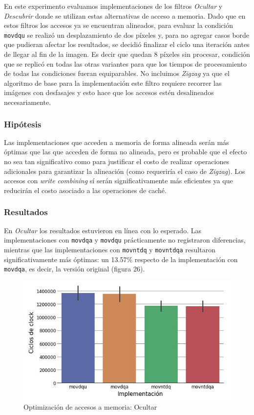 \documentclass[a4paper]{article}
\begin{document}
En este experimento evaluamos implementaciones de los filtros \textit{Ocultar} y \textit{Descubrir} donde se utilizan estas alternativas de acceso a memoria. Dado que en estos filtros los accesos ya se encuentran alineados, para evaluar la condición {\tt movdqu} se realizó un desplazamiento de dos píxeles y, para no agregar casos borde que pudieran afectar los resultados, se decidió finalizar el ciclo una iteración antes de llegar al fin de la imagen. Es decir que quedan 8 píxeles sin procesar, condición que se replicó en todas las otras variantes para que los tiempos de procesamiento de todas las condiciones fueran equiparables. No incluimos \textit{Zigzag} ya que el algoritmo de base para la implementación este filtro requiere recorrer las imágenes con desfasajes y esto hace que los accesos estén desalineados necesariamente.

\subsubsection{Hipótesis}
Las implementaciones que acceden a memoria de forma alineada serán más óptimas que las que acceden de forma no alineada, pero es probable que el efecto no sea tan significativo como para justificar el costo de realizar operaciones adicionales para garantizar la alineación (como requeriría el caso de \textit{Zigzag}). Los accesos con \textit{write combining} sí serán significativamente más eficientes ya que reducirán el costo asociado a las operaciones de caché.

\subsubsection{Resultados}
En \textit{Ocultar} los resultados estuvieron en línea con lo esperado. Las implementaciones con {\tt movdqa} y {\tt movdqu} prácticamente no registraron diferencias, mientras que las implementaciones con {\tt movntdq} y {\tt movntdqa} resultaron significativamente más óptimas: un 13.57\% respecto de la implementación con {\tt movdqa}, es decir, la versión original (figura 26).

\begin{figure}[!htb]
  \begin{center}
	\includegraphics[scale=0.6]{img/exp3ocultar.jpg}
	\caption{Optimización de accesos a memoria: Ocultar}
  \end{center}
\end{figure}
\end{document}
